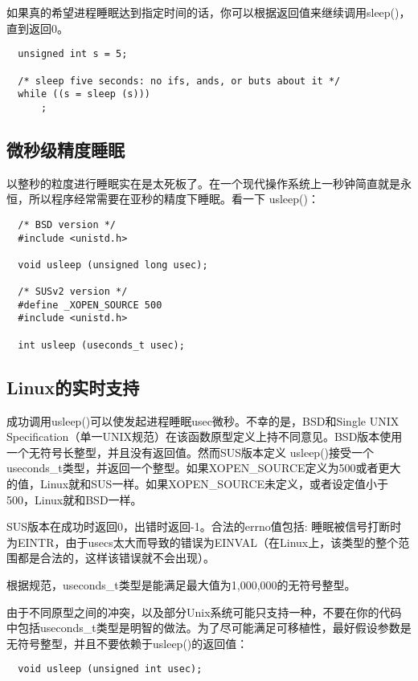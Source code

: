 如果真的希望进程睡眠达到指定时间的话，你可以根据返回值来继续调用sleep()，直到返回0。 

\begin{lstlisting}
﻿  unsigned int s = 5;

  /* sleep five seconds: no ifs, ands, or buts about it */
  while ((s = sleep (s)))
      ;
\end{lstlisting}

\subsection{微秒级精度睡眠}

以整秒的粒度进行睡眠实在是太死板了。在一个现代操作系统上一秒钟简直就是永恒，所以程序经常需要在亚秒的精度下睡眠。看一下 usleep()：
 
\begin{lstlisting}
  /* BSD version */
  #include <unistd.h>

  void usleep (unsigned long usec);
 
  /* SUSv2 version */
  #define _XOPEN_SOURCE 500
  #include <unistd.h>
 
  int usleep (useconds_t usec);
\end{lstlisting}

\subsection{Linux的实时支持}

成功调用usleep()可以使发起进程睡眠usec微秒。不幸的是，BSD和Single UNIX Specification（单一UNIX规范）在该函数原型定义上持不同意见。BSD版本使用一个无符号长整型，并且没有返回值。然而SUS版本定义 usleep()接受一个useconds\_t类型，并返回一个整型。如果XOPEN\_SOURCE定义为500或者更大的值，Linux就和SUS一样。如果XOPEN\_SOURCE未定义，或者设定值小于500，Linux就和BSD一样。

SUS版本在成功时返回0，出错时返回-1。合法的errno值包括: 睡眠被信号打断时为EINTR，由于usecs太大而导致的错误为EINVAL（在Linux上，该类型的整个范围都是合法的，这样该错误就不会出现）。

根据规范，useconds\_t类型是能满足最大值为1,000,000的无符号整型。

由于不同原型之间的冲突，以及部分Unix系统可能只支持一种，不要在你的代码中包括useconds\_t类型是明智的做法。为了尽可能满足可移植性，最好假设参数是无符号整型，并且不要依赖于usleep()的返回值： 

\begin{lstlisting}
  void usleep (unsigned int usec);
\end{lstlisting}

